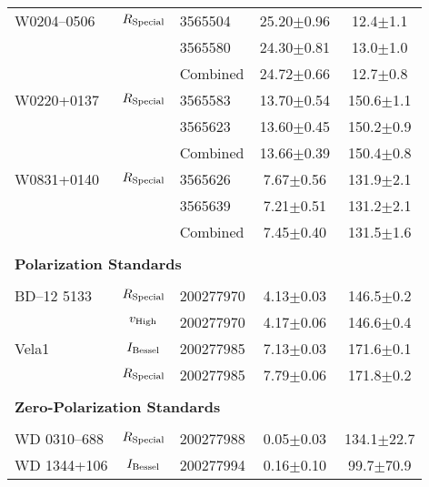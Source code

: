 \begin{table}
\begin{tabular}{lclcc}
        W0204--0506  & $R_{\rm Special}$ & 3565504   &           25.20$\pm$0.96 & \phantom{0}12.4$\pm$1.1 \\
                     &                   & 3565580   &           24.30$\pm$0.81 & \phantom{0}13.0$\pm$1.0 \\
                     &                   & Combined  &           24.72$\pm$0.66 & \phantom{0}12.7$\pm$0.8 \\
        W0220+0137   & $R_{\rm Special}$ & 3565583   &           13.70$\pm$0.54 &           150.6$\pm$1.1 \\
                     &                   & 3565623   &           13.60$\pm$0.45 &           150.2$\pm$0.9 \\
                     &                   & Combined  &           13.66$\pm$0.39 &           150.4$\pm$0.8 \\
        W0831+0140   & $R_{\rm Special}$ & 3565626   & \phantom{0}7.67$\pm$0.56 &           131.9$\pm$2.1 \\
                     &                   & 3565639   & \phantom{0}7.21$\pm$0.51 &           131.2$\pm$2.1 \\
                     &                   & Combined  & \phantom{0}7.45$\pm$0.40 &           131.5$\pm$1.6 \\
        \\
        \multicolumn{5}{l}{\bf{Polarization Standards}}\\\\
        BD--12 5133  & $R_{\rm Special}$ & 200277970 & \phantom{0}4.13$\pm$0.03 &           146.5$\pm$0.2 \\
                     & $v_{\rm High}$    & 200277970 & \phantom{0}4.17$\pm$0.06 &           146.6$\pm$0.4 \\
        Vela1        & $I_{\rm Bessel}$  & 200277985 & \phantom{0}7.13$\pm$0.03 &           171.6$\pm$0.1 \\
                     & $R_{\rm Special}$ & 200277985 & \phantom{0}7.79$\pm$0.06 &           171.8$\pm$0.2 \\
        \\
        \multicolumn{5}{l}{\bf{Zero-Polarization Standards}}\\\\
        WD 0310--688 & $R_{\rm Special}$ & 200277988 & \phantom{0}0.05$\pm$0.03 &          134.1$\pm$22.7 \\
        WD 1344+106  & $I_{\rm Bessel}$  & 200277994 & \phantom{0}0.16$\pm$0.10 & \phantom{0}99.7$\pm$70.9 \\

\end{tabular}
\end{table}

